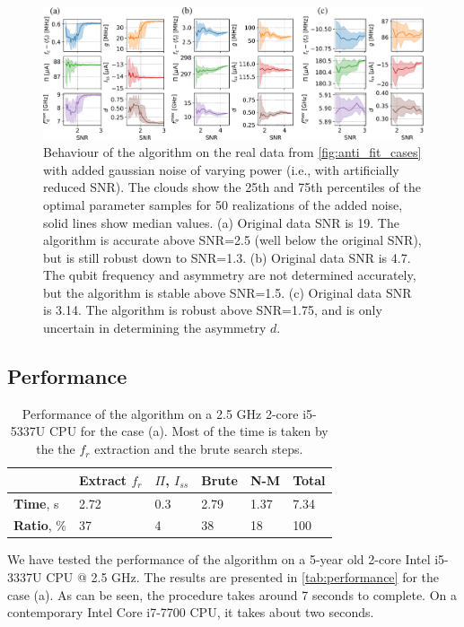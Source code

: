 \documentclass[%
 aip,
 draft,
 amsmath,amssymb,
 reprint,%
]{revtex4-1}
\begin{document}
\begin{figure}
	\centering
	\includegraphics[width=\linewidth]{noise_test}
	\caption{Behaviour of the algorithm on the real data from \autoref{fig:anti_fit_cases} with added gaussian noise of varying power (i.e., with artificially reduced SNR). The clouds show the 25th and 75th percentiles of the optimal parameter samples for 50 realizations of the added noise, solid lines show median values. (a) Original data SNR is 19. The algorithm is accurate above SNR=2.5 (well below the original SNR), but is still robust down to SNR=1.3. (b) Original data SNR is 4.7. The qubit frequency and asymmetry are not determined accurately, but the algorithm is stable above SNR=1.5. (c) Original data SNR is 3.14. The algorithm is robust above SNR=1.75, and is only uncertain in determining the asymmetry $d$.}
	\label{fig:noise_test}
\end{figure}

\subsection{Performance}


\begin{table}[b]
	\begin{ruledtabular}
		\begin{tabular}{llllll}
			&Extract $f_r$& $\Pi$, $I_{ss}$ & Brute &N-M &
			\textbf{Total}\\\hline
			\textbf{Time}, s& 2.72& 0.3&2.79&1.37&7.34\\
			\textbf{Ratio}, \% & 37 &4 &38 &18 &100
		\end{tabular}
	\end{ruledtabular}
	\caption{Performance of the algorithm on a 2.5 GHz 2-core i5-5337U CPU for the case (a). Most of the time is taken by the the $f_r$ extraction and the brute search steps.}
	\label{tab:performance}
\end{table}

We have tested the performance of the algorithm on a 5-year old 2-core Intel i5-3337U CPU @ 2.5 GHz. The results are presented in \autoref{tab:performance} for the case (a).  As can be seen, the procedure takes around 7 seconds to complete. On a contemporary Intel Core i7-7700 CPU, it takes about two seconds. 
\end{document}
